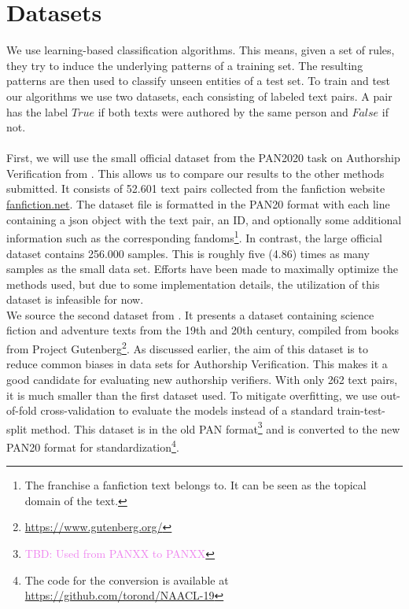 \chapter{Datasets}\label{ch:datasets}
We use learning-based classification algorithms.
This means, given a set of rules, they try to induce the underlying patterns of a training set.
The resulting patterns are then used to classify unseen entities of a test set.
To train and test our algorithms we use two datasets, each consisting of labeled text pairs.
A pair has the label $True$ if both texts were authored by the same person and $False$ if not.\\\\
First, we will use the small official dataset from the PAN2020 task on Authorship Verification from \cite{bevendorff2020overview}.
This allows us to compare our results to the other methods submitted.
It consists of 52.601 text pairs collected from the fanfiction website \url{fanfiction.net}.
The dataset file is formatted in the PAN20 format with each line containing a json object with the text pair, an ID, and optionally some additional information such as the corresponding fandoms\footnote{The franchise a fanfiction text belongs to. It can be seen as the topical domain of the text.}.
In contrast, the large official dataset contains 256.000 samples.
This is roughly five (4.86) times as many samples as the small data set.
Efforts have been made to maximally optimize the methods used, but due to some implementation details, the utilization of this dataset is infeasible for now.\\
We source the second dataset from \cite{stein2019unbiasedGutenbergCorpus}.
It presents a dataset containing science fiction and adventure texts from the 19th and 20th century, compiled from books from Project Gutenberg\footnote{\url{https://www.gutenberg.org/}}.
As discussed earlier, the aim of this dataset is to reduce common biases in data sets for Authorship Verification.
This makes it a good candidate for evaluating new authorship verifiers.
With only 262 text pairs, it is much smaller than the first dataset used.
To mitigate overfitting, we use out-of-fold cross-validation to evaluate the models instead of a standard train-test-split method.
This dataset is in the old PAN format\footnote{\textcolor{violet}{TBD: Used from PANXX to PANXX}} and is converted to the new PAN20 format for standardization\footnote{The code for the conversion is available at \url{https://github.com/torond/NAACL-19}}.\\

